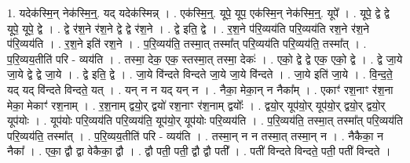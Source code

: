 \documentclass[17pt]{extarticle}
\begin{document}
1. यदेक॑स्मि॒न् नेक॑स्मि॒न्॒. यद् यदेक॑स्मिन्न् । . एक॑स्मि॒न्॒. यूपे॒ यूप॒ एक॑स्मि॒न् नेक॑स्मि॒न्॒. यूपे᳚ । . यूपे॒ द्वे द्वे यूपे॒ यूपे॒ द्वे । . द्वे र॑श॒ने र॑श॒ने द्वे द्वे र॑श॒ने । . द्वे इति॒ द्वे । . र॒श॒ने प॑रि॒व्यय॑ति परि॒व्यय॑ति रश॒ने र॑श॒ने प॑रि॒व्यय॑ति । . र॒श॒ने इति॑ रश॒ने । . प॒रि॒व्यय॑ति॒ तस्मा॒त् तस्मा᳚त् परि॒व्यय॑ति परि॒व्यय॑ति॒ तस्मा᳚त् । . प॒रि॒व्यय॒तीति॑ परि - व्यय॑ति । . तस्मा॒ देक॒ एक॒ स्तस्मा॒त् तस्मा॒ देकः॑ । . एको॒ द्वे द्वे एक॒ एको॒ द्वे । . द्वे जा॒ये जा॒ये द्वे द्वे जा॒ये । . द्वे इति॒ द्वे । . जा॒ये वि॑न्दते विन्दते जा॒ये जा॒ये वि॑न्दते । . जा॒ये इति॑ जा॒ये । . वि॒न्द॒ते॒ यद् यद् वि॑न्दते विन्दते॒ यत् । . यन् न न यद् यन् न । . नैका॒ मेका॒न् न नैका᳚म् । . एकाꣳ॑ रश॒नाꣳ र॑श॒ना मेका॒ मेकाꣳ॑ रश॒नाम् । . र॒श॒नाम् द्वयो॒र् द्वयो॑ रश॒नाꣳ र॑श॒नाम् द्वयोः᳚ । . द्वयो॒र् यूप॑यो॒र् यूप॑यो॒र् द्वयो॒र् द्वयो॒र् यूप॑योः । . यूप॑योः परि॒व्यय॑ति परि॒व्यय॑ति॒ यूप॑यो॒र् यूप॑योः परि॒व्यय॑ति । . प॒रि॒व्यय॑ति॒ तस्मा॒त् तस्मा᳚त् परि॒व्यय॑ति परि॒व्यय॑ति॒ तस्मा᳚त् । . प॒रि॒व्यय॒तीति॑ परि - व्यय॑ति । . तस्मा॒न् न न तस्मा॒त् तस्मा॒न् न । . नैकैका॒ न नैका᳚ । . एका॒ द्वौ द्वा वेकैका॒ द्वौ । . द्वौ पती॒ पती॒ द्वौ द्वौ पती᳚ । . पती॑ विन्दते विन्दते॒ पती॒ पती॑ विन्दते । \newline
\end{document}
